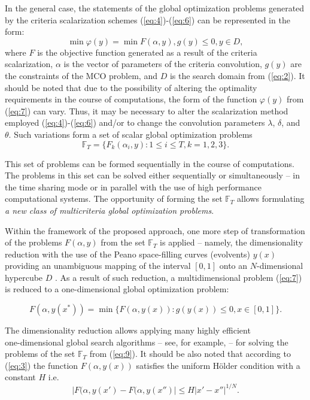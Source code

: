 \documentclass[runningheads]{llncs}
\begin{document}
In the general case, the statements of the global optimization problems generated by the criteria scalarization schemes (\ref{eq:4})-(\ref{eq:6}) can be represented in the form:
\begin{equation}
  \min\varphi(y)=\min{F(\alpha,y)},  g(y) \leq 0, y \in D, 
\label{eq:7}
\end{equation}
where $F$ is the objective function generated as a result of the criteria scalarization, $\alpha$ is the vector of parameters of the criteria convolution, $g(y)$ are the constraints of the MCO problem, and $D$ is the search domain from (\ref{eq:2}). It should be noted that due to the possibility of altering the optimality requirements in the course of computations, the form of the function $\varphi(y)$ from (\ref{eq:7}) can vary. Thus, it may be necessary to alter the scalarization method employed (\ref{eq:4})-(\ref{eq:6}) and/or to change the convolution parameters $\lambda$, $\delta$, and $\theta$. Such variations form a set of scalar global optimization problems
\begin{equation}
  \mathbb{F}_T=\{ F_k (\alpha_i,y): 1\leq i \leq T, k=1,2,3 \}.
\label{eq:9}
\end{equation}

This set of problems can be formed sequentially in the course of computations. The problems in this set can be solved either sequentially or simultaneously -- in the time sharing mode or in parallel with the use of high performance computational systems. The opportunity of forming the set $\mathbb{F}_T$ allows formulating \textit{a new class of multicriteria global optimization problems}.

Within the framework of the  proposed approach, one more step of transformation of the problems $F(\alpha,y)$ from the set $\mathbb{F}_T$ is applied -- namely, the dimensionality reduction with the use of the Peano space-filling curves (evolvents) $y(x)$ providing an unambiguous mapping of the interval $[0,1]$ onto an $N$-dimensional hypercube $D$ \cite{c10,c11}. As a result of such reduction, a multidimensional problem (\ref{eq:7}) is reduced to a one-dimensional global optimization problem:

\begin{equation}
F(\alpha,y(x^*)) = \min{\{F(\alpha,y(x)): g(y(x))\leq 0, x \in [0,1]\}}.
\label{eq:10}
\end{equation}

The dimensionality reduction allows applying many highly efficient\\ one-dimensional global search algorithms -- see, for example, \cite{c10,c11,c12,c14} -- for solving the problems of the set $\mathbb{F}_T$ from (\ref{eq:9}). It should be also noted that according to (\ref{eq:3}) the function $F(\alpha,y(x))$ satisfies the uniform H\"{o}lder condition with a constant $H$ \cite{c10,c11} i.e.
\begin{equation}
  |F(\alpha,y(x' )-F(\alpha,y(x'')|\leq H |x'-x''|^{1/N}.
\label{eq:11}
\end{equation}
\end{document}
